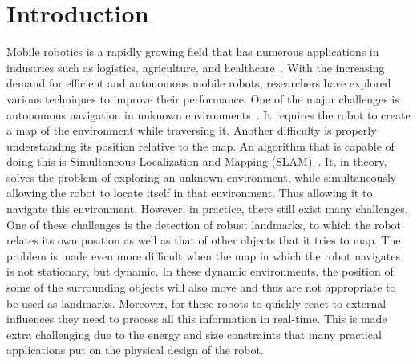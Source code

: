 \chapter{Introduction}\label{chapter:introduction}

Mobile robotics is a rapidly growing field that has numerous applications in industries such as logistics, agriculture, and healthcare~\cite{cognominal2021evolving,kebede2024review,clark2023amazon}. With the increasing demand for efficient and autonomous mobile robots, researchers have explored various techniques to improve their performance. One of the major challenges is autonomous navigation in unknown environments~\cite{alatise2020review}. It requires the robot to create a map of the environment while traversing it. Another difficulty is properly understanding its position relative to the map. An algorithm that is capable of doing this is Simultaneous Localization and Mapping (SLAM)~\cite{whyte1996slam,whyte2006slam}. It, in theory, solves the problem of exploring an unknown environment, while simultaneously allowing the robot to locate itself in that environment. Thus allowing it to navigate this environment. However, in practice, there still exist many challenges. One of these challenges is the detection of robust landmarks, to which the robot relates its own position as well as that of other objects that it tries to map. The problem is made even more difficult when the map in which the robot navigates is not stationary, but dynamic. In these dynamic environments, the position of some of the surrounding objects will also move and thus are not appropriate to be used as landmarks. Moreover, for these robots to quickly react to external influences they need to process all this information in real-time. This is made extra challenging due to the energy and size constraints that many practical applications put on the physical design of the robot.

